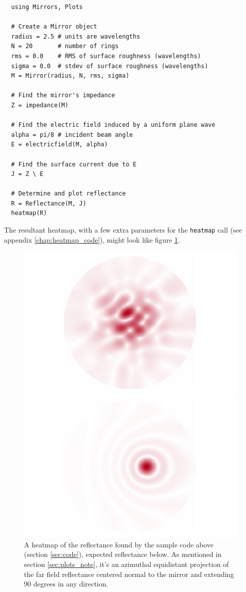 \documentclass[etd,twoside,senior,noacknowledgments]{BYUPhys}
\begin{document}
\begin{verbatim}
  using Mirrors, Plots

  # Create a Mirror object
  radius = 2.5 # units are wavelengths
  N = 20       # number of rings
  rms = 0.0    # RMS of surface roughness (wavelengths)
  sigma = 0.0  # stdev of surface roughness (wavelengths)
  M = Mirror(radius, N, rms, sigma)

  # Find the mirror's impedance
  Z = impedance(M)

  # Find the electric field induced by a uniform plane wave
  alpha = pi/8 # incident beam angle
  E = electricfield(M, alpha)

  # Find the surface current due to E
  J = Z \ E

  # Determine and plot reflectance
  R = Reflectance(M, J)
  heatmap(R)
\end{verbatim}

The resultant heatmap, with a few extra parameters for the \texttt{heatmap} call (see appendix \ref{chap:heatmap_code}), might look like figure \ref{fig:sample_heatmap}.

\begin{figure}
  \centerline{\includegraphics[width=.7\textwidth]{sample-reflectance}}
  \centerline{\includegraphics[width=.7\textwidth]{sample-reflectance-expected}}
  \caption[heatmap from the above sample code]{\label{fig:sample_heatmap}
    A heatmap of the reflectance found by the sample code above (section \ref{sec:code}), expected reflectance below. As mentioned in section \ref{sec:plots_note}, it's an azimuthal equidistant projection of the far field reflectance centered normal to the mirror and extending 90 degrees in any direction.}
\end{figure}
\end{document}

